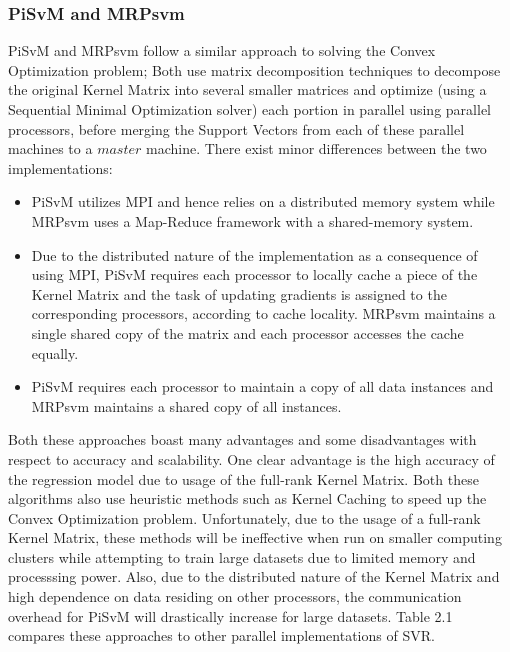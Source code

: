 \documentclass[12pt]{article}
\begin{document}
\subsubsection{PiSvM and MRPsvm}
\label{PiSvM and MRPsvm}
PiSvM and MRPsvm follow a similar approach to solving the Convex Optimization problem; Both use matrix decomposition techniques to decompose the original Kernel Matrix into several smaller matrices and optimize (using a Sequential Minimal Optimization solver) each portion in parallel using parallel processors, before merging the Support Vectors from each of these parallel machines to a $master$ machine.
\newline
There exist minor differences between the two implementations:
\begin{itemize}
\item PiSvM utilizes MPI and hence relies on a distributed memory system while MRPsvm uses a Map-Reduce framework with a shared-memory system.
\item Due to the distributed nature of the implementation as a consequence of using MPI, PiSvM requires each processor to locally cache a piece of the Kernel Matrix and the task of updating gradients is assigned to the corresponding processors, according to cache locality. MRPsvm maintains a single shared copy of the matrix and each processor accesses the cache equally.
\item PiSvM requires each processor to maintain a copy of all data instances and MRPsvm maintains a shared copy of all instances.
\end{itemize}
Both these approaches boast many advantages and some disadvantages with respect to accuracy and scalability. One clear advantage is the high accuracy of the regression model due to usage of the full-rank Kernel Matrix. Both these algorithms also use heuristic methods such as Kernel Caching to speed up the Convex Optimization problem.\newline 
Unfortunately, due to the usage of a full-rank Kernel Matrix, these methods will be ineffective when run on smaller computing clusters while attempting to train large datasets due to limited memory and processsing power. Also, due to the distributed nature of the Kernel Matrix and high dependence on data residing on other processors, the communication overhead for PiSvM will drastically increase for large datasets.
\newline\newline
Table 2.1 compares these approaches to other parallel implementations of SVR.
\end{document}
